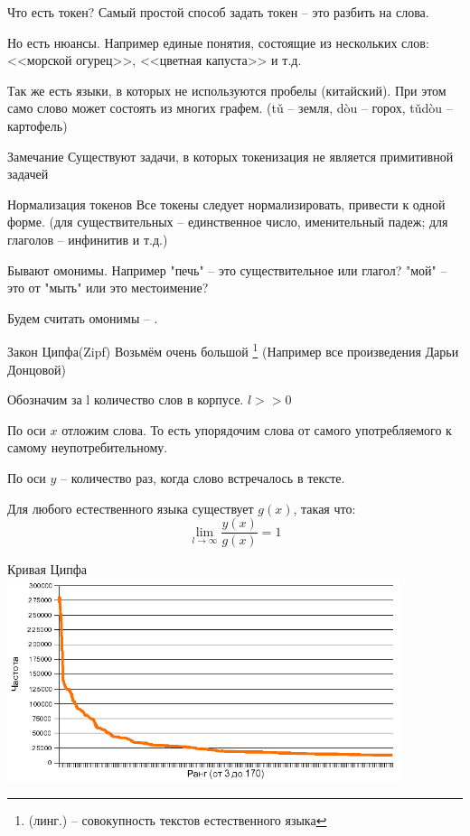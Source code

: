 \begin{frame}{Что есть токен?}
	Самый простой способ задать токен -- это разбить на слова. 
	
	Но есть нюансы. Например единые понятия, состоящие из нескольких слов:
	<<морской огурец>>, <<цветная капуста>> и т.д.
	
	Так же есть языки, в которых не используются пробелы (китайский). 
	При этом само слово может состоять из многих графем. 
	(tǔ -- земля, dòu -- горох, tǔdòu -- картофель)
	
	\begin{block}{Замечание}
		Существуют задачи, в которых токенизация не является примитивной задачей
	\end{block}
\end{frame}

\begin{frame}{Нормализация токенов}
	Все токены следует нормализировать, привести к одной форме. 
	(для существительных -- единственное число, именительный падеж;
	для глаголов -- инфинитив и т.д.)
	
 	Бывают омонимы. Например "печь" -- это существительное или глагол?
	"мой" -- это от "мыть" или это местоимение?
	
	Будем считать омонимы -- .
\end{frame}

\begin{frame}{Закон Ципфа(Zipf)} 
	\small
	Возьмём очень большой \footnote{(линг.) -- совокупность текстов естественного языка}
	(Например все произведения Дарьи Донцовой)
		
	Обозначим за l количество слов в корпусе. $l >> 0$

	По оси $x$ отложим  слова.
	То есть упорядочим слова от самого употребляемого к самому неупотребительному.
	
	По оси $y$ -- количество раз, когда слово встречалось в тексте.
	
	Для любого естественного языка существует  $g(x)$, такая что:
	\begin{equation}
	\lim_{l \longrightarrow \infty} \frac{y(x)}{g(x)} = 1
	\end{equation}
\end{frame}

\begin{frame}{Кривая Ципфа}
	\includegraphics[width=11.5cm]{../pic/zipf_curve.png}
\end{frame}



